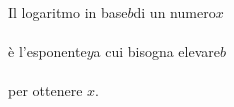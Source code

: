 \documentclass[preview]{standalone}
\begin{document}
\begin{center}
Il logaritmo in base$b$di un numero$x$\\\\è l'esponente$y$a cui bisogna elevare$b$\\\\per ottenere $x$.
\end{center}
\end{document}
